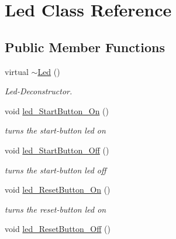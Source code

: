 \hypertarget{classLed}{\section{Led Class Reference}
\label{classLed}
}
\subsection*{Public Member Functions}
\begin{DoxyCompactItemize}
\item 
\hypertarget{classLed_a9685f23dc5ca68091579ab621c44753a}{virtual \hyperlink{classLed_a9685f23dc5ca68091579ab621c44753a}{$\sim$\-Led} ()}\label{classLed_a9685f23dc5ca68091579ab621c44753a}

\begin{DoxyCompactList}\small\item\em Led-\/\-Deconstructor. \end{DoxyCompactList}\item 
\hypertarget{classLed_ae975e138319b442936117fba1ec3a618}{void \hyperlink{classLed_ae975e138319b442936117fba1ec3a618}{led\-\_\-\-Start\-Button\-\_\-\-On} ()}\label{classLed_ae975e138319b442936117fba1ec3a618}

\begin{DoxyCompactList}\small\item\em turns the start-\/button led on \end{DoxyCompactList}\item 
\hypertarget{classLed_af7dc6d8a2760d1dbe61f5219d72a9613}{void \hyperlink{classLed_af7dc6d8a2760d1dbe61f5219d72a9613}{led\-\_\-\-Start\-Button\-\_\-\-Off} ()}\label{classLed_af7dc6d8a2760d1dbe61f5219d72a9613}

\begin{DoxyCompactList}\small\item\em turns the start-\/button led off \end{DoxyCompactList}\item 
\hypertarget{classLed_a4f13d40b3e284aae8679b584f223db29}{void \hyperlink{classLed_a4f13d40b3e284aae8679b584f223db29}{led\-\_\-\-Reset\-Button\-\_\-\-On} ()}\label{classLed_a4f13d40b3e284aae8679b584f223db29}

\begin{DoxyCompactList}\small\item\em turns the reset-\/button led on \end{DoxyCompactList}\item 
\hypertarget{classLed_a153abe5004c72fc1bede1035e3615c56}{void \hyperlink{classLed_a153abe5004c72fc1bede1035e3615c56}{led\-\_\-\-Reset\-Button\-\_\-\-Off} ()}\label{classLed_a153abe5004c72fc1bede1035e3615c56}


\end{DoxyCompactItemize}
